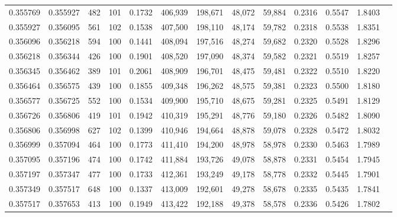 \begin{tabular}{rrrrrrrrrrrrr}
0.355769 & 0.355927 &   482 & 101 &                                     0.1732 & 406,939 & 198,671 &  48,072 &  59,884 & 0.2316 & 0.5547 & 1.8403 \\
0.355927 & 0.356095 &   561 & 102 &                                     0.1538 & 407,500 & 198,110 &  48,174 &  59,782 & 0.2318 & 0.5538 & 1.8351 \\
0.356096 & 0.356218 &   594 & 100 &                                     0.1441 & 408,094 & 197,516 &  48,274 &  59,682 & 0.2320 & 0.5528 & 1.8296 \\
0.356218 & 0.356344 &   426 & 100 &                                     0.1901 & 408,520 & 197,090 &  48,374 &  59,582 & 0.2321 & 0.5519 & 1.8257 \\
0.356345 & 0.356462 &   389 & 101 &                                     0.2061 & 408,909 & 196,701 &  48,475 &  59,481 & 0.2322 & 0.5510 & 1.8220 \\
0.356464 & 0.356575 &   439 & 100 &                                     0.1855 & 409,348 & 196,262 &  48,575 &  59,381 & 0.2323 & 0.5500 & 1.8180 \\
0.356577 & 0.356725 &   552 & 100 &                                     0.1534 & 409,900 & 195,710 &  48,675 &  59,281 & 0.2325 & 0.5491 & 1.8129 \\
0.356726 & 0.356806 &   419 & 101 &                                     0.1942 & 410,319 & 195,291 &  48,776 &  59,180 & 0.2326 & 0.5482 & 1.8090 \\
0.356806 & 0.356998 &   627 & 102 &                                     0.1399 & 410,946 & 194,664 &  48,878 &  59,078 & 0.2328 & 0.5472 & 1.8032 \\
0.356999 & 0.357094 &   464 & 100 &                                     0.1773 & 411,410 & 194,200 &  48,978 &  58,978 & 0.2330 & 0.5463 & 1.7989 \\
0.357095 & 0.357196 &   474 & 100 &                                     0.1742 & 411,884 & 193,726 &  49,078 &  58,878 & 0.2331 & 0.5454 & 1.7945 \\
0.357197 & 0.357347 &   477 & 100 &                                     0.1733 & 412,361 & 193,249 &  49,178 &  58,778 & 0.2332 & 0.5445 & 1.7901 \\
0.357349 & 0.357517 &   648 & 100 &                                     0.1337 & 413,009 & 192,601 &  49,278 &  58,678 & 0.2335 & 0.5435 & 1.7841 \\
0.357517 & 0.357653 &   413 & 100 &                                     0.1949 & 413,422 & 192,188 &  49,378 &  58,578 & 0.2336 & 0.5426 & 1.7802 \\

\end{tabular}
